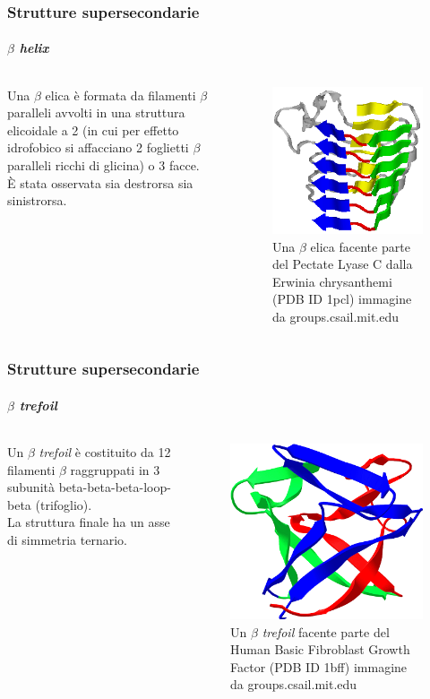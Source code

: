 \documentclass{beamer}
\begin{document}
\begin{frame}
\frametitle{Strutture supersecondarie}
  \framesubtitle{\itshape{$\beta$ helix}}\begin{columns}
Una $\beta$ elica è formata da filamenti $\beta$ paralleli avvolti in una struttura elicoidale a 2 (in cui per effetto idrofobico si affacciano 2 foglietti $\beta$ paralleli ricchi di glicina) o 3 facce.\\ È stata osservata sia destrorsa sia sinistrorsa.
   \vskip -10pt \begin{figure}
\centering
\includegraphics[scale=0.45]{betaHelix.png}\caption{Una $\beta$ elica facente parte del Pectate Lyase C dalla Erwinia chrysanthemi (PDB ID 1pcl) \tiny{immagine da groups.csail.mit.edu}}
\end{figure} \end{columns}
\end{frame}
\begin{frame}
\frametitle{Strutture supersecondarie}
  \framesubtitle{\itshape{$\beta$ \emph{trefoil}}}
\begin{columns}
Un $\beta$ \emph{trefoil} è costituito da 12 filamenti $\beta$ raggruppati in 3 subunità beta-beta-beta-loop-beta (trifoglio).\\
La struttura finale ha un asse di simmetria ternario.
\begin{figure}
\centering
\includegraphics[scale=0.35]{trefoil.png}\caption{Un $\beta$ \emph{trefoil} facente parte del Human Basic Fibroblast Growth Factor (PDB ID 1bff) \tiny{immagine da groups.csail.mit.edu}}
\end{figure} \end{columns}
\end{frame}
\end{document}
